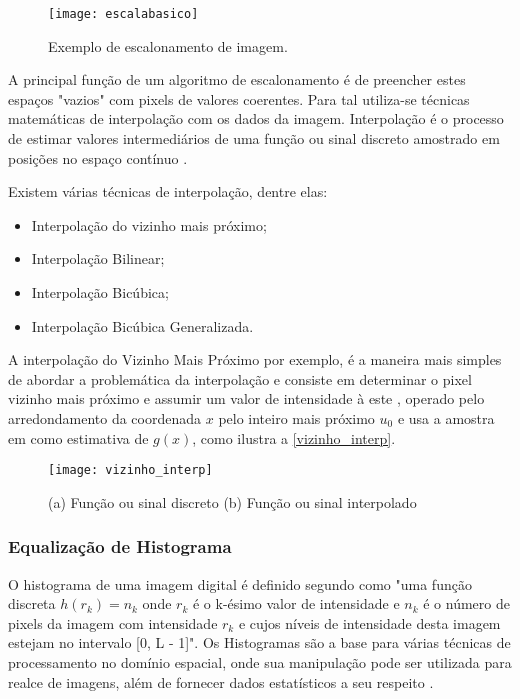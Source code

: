 \begin{figure}[h]
	\centering
	\texttt{[image: escalabasico]}
	\caption{Exemplo de escalonamento de imagem.}
	\label{escalabasico}
\end{figure}

A principal função de um algoritmo de escalonamento é de preencher estes espaços "vazios" com pixels de valores coerentes. Para tal utiliza-se técnicas matemáticas de interpolação com os dados da imagem. Interpolação é o processo de estimar valores intermediários de uma função ou sinal discreto amostrado em posições no espaço contínuo \cite{luiz_vizinho}.

Existem várias técnicas de interpolação, dentre elas:

\begin{itemize}
	\item Interpolação do vizinho mais próximo;
	\item Interpolação Bilinear;
	\item Interpolação Bicúbica;
	\item Interpolação Bicúbica Generalizada.
\end{itemize}

A interpolação do Vizinho Mais Próximo por exemplo, é a maneira mais simples de abordar a problemática da interpolação e consiste em determinar o pixel vizinho mais próximo e assumir um valor de intensidade à este \cite{giassa_escalona}, operado pelo arredondamento da coordenada $x$ pelo inteiro mais próximo $u_0$ e usa a amostra em como estimativa de $g(x)$, como ilustra a \autoref{vizinho_interp}.

\begin{figure}[h]
	\centering
	\texttt{[image: vizinho\_interp]}
	\caption{(a) Função ou sinal discreto (b) Função ou sinal interpolado }
	\label{vizinho_interp}
\end{figure}


\subsubsection{Equalização de Histograma}\label{subsubsec:equalizacao}

O histograma de uma imagem digital é definido segundo \cite{gonzalez_woods} como "uma função discreta $h(r_k)=n_k$ onde  $r_k$ é o k-ésimo valor de intensidade e $n_k$  é o número de pixels da imagem com intensidade $r_k$ e cujos níveis de intensidade desta imagem estejam no intervalo [0, L - 1]". Os Histogramas são a base para várias técnicas de processamento no domínio espacial, onde sua manipulação pode ser utilizada para realce de imagens, além de fornecer dados estatísticos a seu respeito \cite{gonzalez_woods}.


